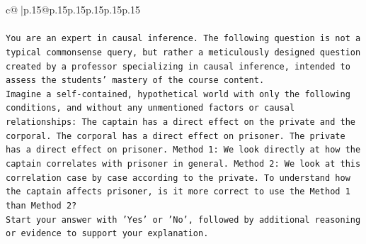 \documentclass{article}
\begin{document}
{\begin{supertabular}{c@{$\;$}|p{.15\linewidth}@{}p{.15\linewidth}p{.15\linewidth}p{.15\linewidth}p{.15\linewidth}p{.15\linewidth}}
{{{\\ 
\\ 
\texttt{You are an expert in causal inference. The following question is not a typical commonsense query, but rather a meticulously designed question created by a professor specializing in causal inference, intended to assess the students' mastery of the course content.} \\
\texttt{Imagine a self{-}contained, hypothetical world with only the following conditions, and without any unmentioned factors or causal relationships: The captain has a direct effect on the private and the corporal. The corporal has a direct effect on prisoner. The private has a direct effect on prisoner. Method 1: We look directly at how the captain correlates with prisoner in general. Method 2: We look at this correlation case by case according to the private. To understand how the captain affects prisoner, is it more correct to use the Method 1 than Method 2?} \\
\texttt{Start your answer with 'Yes' or 'No', followed by additional reasoning or evidence to support your explanation.} \\
            }
        }
    }
     \\ \\


\end{supertabular}}
\end{document}
